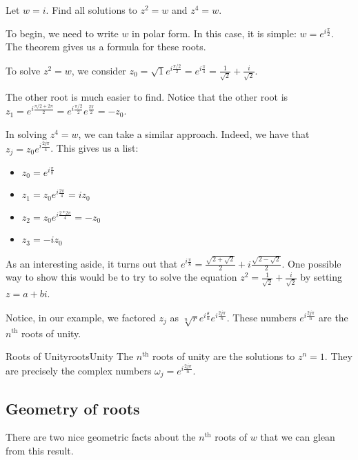 \begin{ex}{}{} Let $w = i$. Find all solutions to $z^2 = w$ and $z^4 = w$.


To begin, we need to write $w$ in polar form. In this case, it is simple: $w = e^{i\frac{\pi}{2}}$. The theorem gives us a formula for these roots.

To solve $z^2 = w$, we consider $z_0 = \sqrt{1}e^{i\frac{\pi/2}{2}} = e^{i\frac{\pi}{4}} = \frac{1}{\sqrt{2}} + \frac{i}{\sqrt{2}}$.

The other root is much easier to find. Notice that the other root is $z_1 = e^{i\frac{\pi/2 + 2\pi}{2}} = e^{i\frac{\pi/2}{2}}e^{\frac{2\pi}{2}} = -z_0$.

In solving $z^4 = w$, we can take a similar approach. Indeed, we have that $z_j = z_0e^{i\frac{2j\pi}{4}}$. This gives us a list:

\begin{itemize}
\item $z_0 = e^{i\frac{\pi}{8}}$
\item $z_1 = z_0e^{i\frac{2\pi}{4}} = iz_0$
\item $z_2 = z_0e^{i\frac{2*2\pi}{4}}= -z_0$
\item $z_3 = -iz_0$
\end{itemize}

As an interesting aside, it turns out that $e^{i\frac{\pi}{8}} = \frac{\sqrt{2 + \sqrt{2}}}{2} + i\frac{\sqrt{2 - \sqrt{2}}}{2}$. One possible way to show this would be to try to solve the equation $z^2 = \frac{1}{\sqrt{2}} + \frac{i}{\sqrt{2}}$ by setting $z = a + bi$.
\end{ex}

Notice, in our example, we factored $z_j$ as $\sqrt[n]{r}e^{i\frac{\theta}{n}}e^{i\frac{2j\pi}{n}}$. These numbers $e^{i\frac{2j\pi}{n}}$ are the $n^{\text{th}}$ roots of unity.

\begin{defbo}{Roots of Unity}{rootsUnity}
The $n^{\text{th}}$ roots of unity are the solutions to $z^n = 1$. They are precisely the complex numbers $\omega_j = e^{i\frac{2j\pi}{n}}$.
\end{defbo}

\subsection{Geometry of roots}

There are two nice geometric facts about the $n^{\text{th}}$ roots of $w$ that we can glean from this result.

